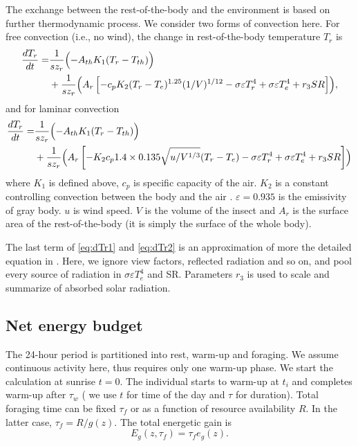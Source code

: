The exchange between the rest-of-the-body and the environment is based on further thermodynamic process. 
We consider two forms of convection here. 
For free convection (i.e., no wind), the change in rest-of-the-body temperature $T_r$ is
\begin{equation} \label{eq:dTr1} 
	\begin{split}
		\frac{dT_{r}}{dt} = & \frac{1}{s z_{r}} \Bigl( - A_{th} K_1(T_r - T_{th})  \Bigr)\\
			&+ \frac{1}{s z_{r}} \Bigl( A_r \left[ - c_p K_2 (T_r- T_e)^{1.25} (1/V)^{1/12}- \sigma \varepsilon T_r^4 + \sigma 					\varepsilon T_e^4  + r_3 SR  \right] \Bigr),
	\end{split}
\end{equation}
and for laminar convection
\begin{equation} \label{eq:dTr2}
	\begin{split}
		\frac{dT_{r}}{dt} = & \frac{1}{s z_{r}} \Bigl( - A_{th} K_1(T_r - T_{th}) \Bigl) \\
	 	  & + \frac{1}{s z_{r}} \Bigl( A_r \left[ - K_2 c_p  1.4 \times 0.135 \sqrt{u/V^{1/3}} (T_r- T_e) - \sigma \varepsilon T_r^4 				+ \sigma \varepsilon T_e^4  + r_3 SR  \right] \Bigr)
	\end{split}
\end{equation}
where $K_1$ is defined above, $c_p$ is specific capacity of the air. 
$K_2$ is a constant controlling convection between the body and the air \citep{Campbell2012}.
$\varepsilon = 0.935$  is the emissivity of gray body.
$u$ is wind speed.
$V$ is the volume of the insect and $A_r$ is the surface area of the rest-of-the-body (it is simply the surface of the whole body).

The last term of \cref{eq:dTr1} and \cref{eq:dTr2} is an approximation of more the detailed equation in \citet{Campbell2012}.
Here, we ignore view factors, reflected radiation and so on, and pool every source of radiation in $ \sigma \varepsilon T_e^4$ and SR. 
Parameters $r_3$ is used to scale and summarize of absorbed solar radiation.
 
\subsection*{Net energy budget}
The 24-hour period is partitioned into rest, warm-up and foraging.
We assume continuous activity here, thus requires only one warm-up phase.
We start the calculation at sunrise $t = 0$.
The individual starts to warm-up at $t_i$ and completes warm-up after $\tau_w$ ( we use $t$ for time of the day and $\tau$ for duration).
Total foraging time can be fixed $\tau_f$ or as a function of resource availability $R$. 
In the latter case, $\tau_f = R/g(z)$.
The total energetic gain is 
\[
	E_g(z,\tau_f) = \tau_f e_g(z).
\]

